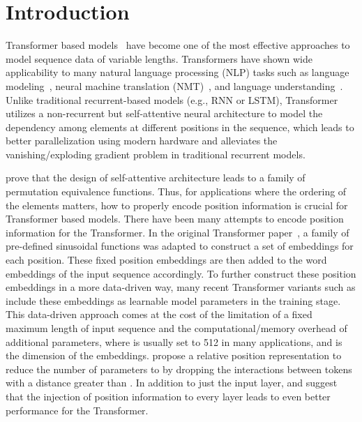 \documentclass[11pt]{article}
\begin{document}
\section{Introduction}
\label{sec:intro}
Transformer based models~\cite{vaswani2017attention,devlin2018bert,yang2019xlnet,radford2019language, lan2019albert,raffel2019exploring}
have become one of the most effective approaches to model sequence data of
variable lengths. Transformers have shown wide applicability to many natural
language processing (NLP) tasks such as language
modeling~\cite{radford2019language}, neural machine translation
(NMT)~\cite{vaswani2017attention}, and language
understanding~\cite{devlin2018bert}.  Unlike traditional recurrent-based
models (e.g., RNN or LSTM), Transformer utilizes a non-recurrent but
self-attentive neural architecture to model the dependency among elements at
different positions in the sequence, which leads to better parallelization
using modern hardware and alleviates the vanishing/exploding gradient problem
in traditional recurrent models.
\par
\cite{yun2019Transformers} prove that the design of self-attentive architecture leads to a family of permutation equivalence functions. Thus, for applications where the ordering of the elements matters, how to properly encode position information is crucial for  Transformer based models. There have been many attempts to encode position information for the Transformer. In the original Transformer paper~\cite{vaswani2017attention}, a family of pre-defined sinusoidal functions was adapted to construct a set of embeddings for each position. These fixed position embeddings are then added to the word embeddings of the input sequence accordingly. To further construct these position embeddings in a more data-driven way, many recent Transformer variants such as \cite{devlin2018bert, liu2019roberta} include these embeddings as learnable model parameters in the training stage. This data-driven approach comes at the cost of the limitation of a fixed maximum length of input sequence  and the computational/memory overhead of additional  parameters, where  is usually set to 512 in many applications, and  is the dimension of the embeddings. \cite{shaw2018self} propose a relative position representation to reduce the number of parameters to  by dropping the interactions between tokens with a distance greater than . In addition to just the input layer, \cite{dehghani2018universal} and \cite{lan2019albert} suggest that the injection of position information to every layer leads to even better performance for the Transformer.
\end{document}
